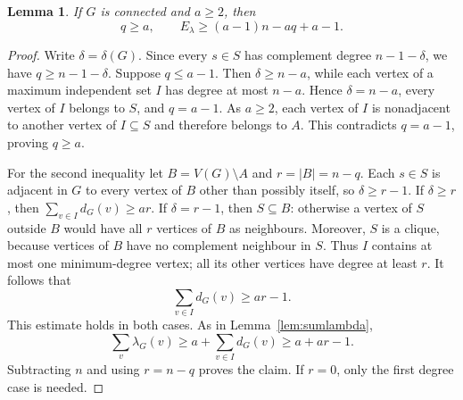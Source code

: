 \documentclass[11pt,a4paper]{article}
\newtheorem{lemma}[theorem]{Lemma}
\theoremstyle{remark}
\begin{document}
\begin{lemma}\label{lem:qbounds}
If $G$ is connected and $a\ge2$, then
\begin{equation}\label{eq:qbounds}
q\ge a,\qquad E_\lambda\ge(a-1)n-aq+a-1.
\end{equation}
\end{lemma}
\begin{proof}
Write $\delta=\delta(G)$. Since every $s\in S$ has complement degree
$n-1-\delta$, we have $q\ge n-1-\delta$. Suppose $q\le a-1$.
Then $\delta\ge n-a$, while each vertex of a maximum independent set
$I$ has degree at most $n-a$. Hence $\delta=n-a$, every vertex of $I$
belongs to $S$, and $q=a-1$. As $a\ge2$, each vertex of $I$ is
nonadjacent to another vertex of $I\subseteq S$ and therefore belongs
to $A$. This contradicts $q=a-1$, proving $q\ge a$.

For the second inequality let $B=V(G)\setminus A$ and $r=|B|=n-q$.
Each $s\in S$ is adjacent in $G$ to every vertex of $B$ other than
possibly itself, so $\delta\ge r-1$.
If $\delta\ge r$, then $\sum_{v\in I}d_G(v)\ge ar$.
If $\delta=r-1$, then $S\subseteq B$: otherwise a vertex of $S$
outside $B$ would have all $r$ vertices of $B$ as neighbours.
Moreover, $S$ is a clique, because vertices of $B$ have no complement
neighbour in $S$. Thus $I$ contains at most one minimum-degree vertex;
all its other vertices have degree at least $r$. It follows that
\[
\sum_{v\in I}d_G(v)\ge ar-1.
\]
This estimate holds in both cases. As in Lemma~\ref{lem:sumlambda},
\[
\sum_v\lambda_G(v)\ge a+\sum_{v\in I}d_G(v)\ge a+ar-1.
\]
Subtracting $n$ and using $r=n-q$ proves the claim. If $r=0$, only
the first degree case is needed.
\end{proof}
\end{document}
